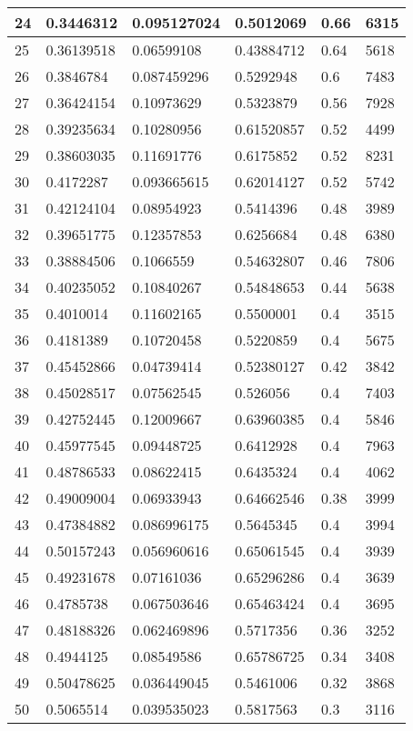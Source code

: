 \begin{longtable}{|l|l|l|l|l|l|}
24 & 0.3446312 & 0.095127024 & 0.5012069 & 0.66 & 6315 \\ \hline 
25 & 0.36139518 & 0.06599108 & 0.43884712 & 0.64 & 5618 \\ \hline 
26 & 0.3846784 & 0.087459296 & 0.5292948 & 0.6 & 7483 \\ \hline 
27 & 0.36424154 & 0.10973629 & 0.5323879 & 0.56 & 7928 \\ \hline 
28 & 0.39235634 & 0.10280956 & 0.61520857 & 0.52 & 4499 \\ \hline 
29 & 0.38603035 & 0.11691776 & 0.6175852 & 0.52 & 8231 \\ \hline 
30 & 0.4172287 & 0.093665615 & 0.62014127 & 0.52 & 5742 \\ \hline 
31 & 0.42124104 & 0.08954923 & 0.5414396 & 0.48 & 3989 \\ \hline 
32 & 0.39651775 & 0.12357853 & 0.6256684 & 0.48 & 6380 \\ \hline 
33 & 0.38884506 & 0.1066559 & 0.54632807 & 0.46 & 7806 \\ \hline 
34 & 0.40235052 & 0.10840267 & 0.54848653 & 0.44 & 5638 \\ \hline 
35 & 0.4010014 & 0.11602165 & 0.5500001 & 0.4 & 3515 \\ \hline 
36 & 0.4181389 & 0.10720458 & 0.5220859 & 0.4 & 5675 \\ \hline 
37 & 0.45452866 & 0.04739414 & 0.52380127 & 0.42 & 3842 \\ \hline 
38 & 0.45028517 & 0.07562545 & 0.526056 & 0.4 & 7403 \\ \hline 
39 & 0.42752445 & 0.12009667 & 0.63960385 & 0.4 & 5846 \\ \hline 
40 & 0.45977545 & 0.09448725 & 0.6412928 & 0.4 & 7963 \\ \hline 
41 & 0.48786533 & 0.08622415 & 0.6435324 & 0.4 & 4062 \\ \hline 
42 & 0.49009004 & 0.06933943 & 0.64662546 & 0.38 & 3999 \\ \hline 
43 & 0.47384882 & 0.086996175 & 0.5645345 & 0.4 & 3994 \\ \hline 
44 & 0.50157243 & 0.056960616 & 0.65061545 & 0.4 & 3939 \\ \hline 
45 & 0.49231678 & 0.07161036 & 0.65296286 & 0.4 & 3639 \\ \hline 
46 & 0.4785738 & 0.067503646 & 0.65463424 & 0.4 & 3695 \\ \hline 
47 & 0.48188326 & 0.062469896 & 0.5717356 & 0.36 & 3252 \\ \hline 
48 & 0.4944125 & 0.08549586 & 0.65786725 & 0.34 & 3408 \\ \hline 
49 & 0.50478625 & 0.036449045 & 0.5461006 & 0.32 & 3868 \\ \hline 
50 & 0.5065514 & 0.039535023 & 0.5817563 & 0.3 & 3116 \\ \hline 
\end{longtable}